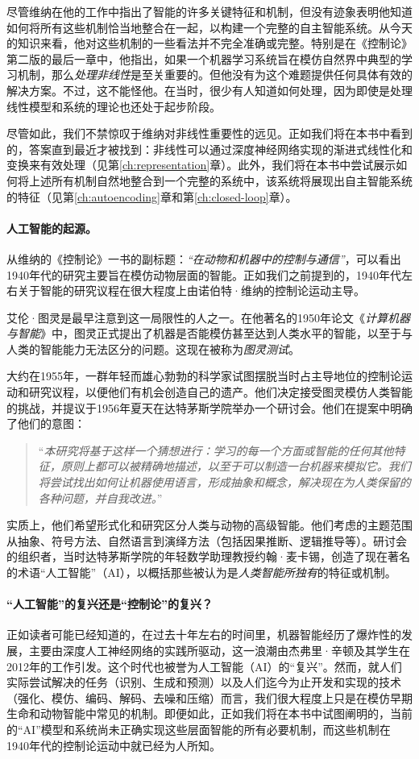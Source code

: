 \documentclass[../../book-main_zh.tex]{subfiles}
\begin{document}
尽管维纳在他的工作中指出了智能的许多关键特征和机制，但没有迹象表明他知道如何将所有这些机制恰当地整合在一起，以构建一个完整的自主智能系统。从今天的知识来看，他对这些机制的一些看法并不完全准确或完整。特别是在《控制论》第二版的最后一章\cite{Wiener-Cybernetics-1961}中，他指出，如果一个机器学习系统旨在模仿自然界中典型的学习机制，那么{\em 处理非线性}是至关重要的。但他没有为这个难题提供任何具体有效的解决方案。不过，这不能怪他。在当时，很少有人知道如何处理，因为即使是处理线性模型和系统的理论也还处于起步阶段。

尽管如此，我们不禁惊叹于维纳对非线性重要性的远见。正如我们将在本书中看到的，答案直到最近才被找到：非线性可以通过深度神经网络实现的渐进式线性化和变换来有效处理（见第\ref{ch:representation}章）。此外，我们将在本书中尝试展示如何将上述所有机制自然地整合到一个完整的系统中，该系统将展现出自主智能系统的特征（见第\ref{ch:autoencoding}章和第\ref{ch:closed-loop}章）。

\paragraph{人工智能的起源。}
从维纳的《控制论》一书的副标题：{\em “在动物和机器中的控制与通信”}，可以看出1940年代的研究主要旨在模仿动物层面的智能。正如我们之前提到的，1940年代左右关于智能的研究议程在很大程度上由诺伯特·维纳的控制论运动主导。

艾伦·图灵是最早注意到这一局限性的人之一。在他著名的1950年论文《{\em 计算机器与智能}》\cite{Turing-1950}中，图灵正式提出了机器是否能模仿甚至达到人类水平的智能，以至于与人类的智能能力无法区分的问题。这现在被称为{\em 图灵测试}。

大约在1955年，一群年轻而雄心勃勃的科学家试图摆脱当时占主导地位的控制论运动和研究议程，以便他们有机会创造自己的遗产。他们决定接受图灵模仿人类智能的挑战，并提议于1956年夏天在达特茅斯学院举办一个研讨会。他们在提案中明确了他们的意图：
\begin{quote}
    “{\em 本研究将基于这样一个猜想进行：学习的每一个方面或智能的任何其他特征，原则上都可以被精确地描述，以至于可以制造一台机器来模拟它。我们将尝试找出如何让机器使用语言，形成抽象和概念，解决现在为人类保留的各种问题，并自我改进。}”
\end{quote}
实质上，他们希望形式化和研究区分人类与动物的高级智能。他们考虑的主题范围从抽象、符号方法、自然语言到演绎方法（包括因果推断、逻辑推导等）。研讨会的组织者，当时达特茅斯学院的年轻数学助理教授约翰·麦卡锡，创造了现在著名的术语“人工智能”（AI），以概括那些被认为是{\em 人类智能所独有}的特征或机制。

\paragraph{“人工智能”的复兴还是“控制论”的复兴？}
正如读者可能已经知道的，在过去十年左右的时间里，机器智能经历了爆炸性的发展，主要由深度人工神经网络的实践所驱动，这一浪潮由杰弗里·辛顿及其学生在2012年的工作\cite{krizhevsky2012imagenet}引发。这个时代也被誉为人工智能（AI）的“复兴”。然而，就人们实际尝试解决的任务（识别、生成和预测）以及人们迄今为止开发和实现的技术（强化、模仿、编码、解码、去噪和压缩）而言，我们很大程度上只是在模仿早期生命和动物智能中常见的机制。即便如此，正如我们将在本书中试图阐明的，当前的“AI”模型和系统尚未正确实现这些层面智能的所有必要机制，而这些机制在1940年代的控制论运动中就已经为人所知。
\end{document}
